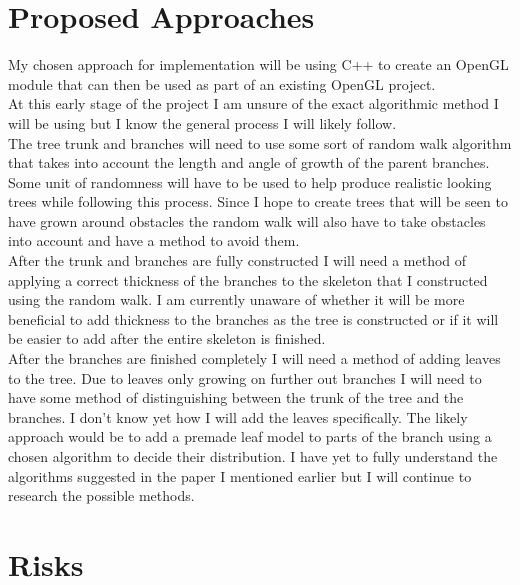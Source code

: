 \documentclass[proposal]{cmpreport}
\begin{document}
\section{Proposed Approaches}
My chosen approach for implementation will be using C++ to create an OpenGL module 
that can then be used as part of an existing OpenGL project. \\
At this early stage of the project I am unsure of the exact algorithmic method I 
will be using but I know the general process I will likely follow. \\
The tree trunk and branches will need to use some sort of random walk algorithm that 
takes into account the length and angle of growth of the parent branches. Some unit 
of randomness will have to be used to help produce realistic looking trees while 
following this process. Since I hope to create trees that will be seen to have grown 
around obstacles the random walk will also have to take obstacles into account and 
have a method to avoid them. \\
After the trunk and branches are fully constructed I will need a method of applying 
a correct thickness of the branches to the skeleton that I constructed using the 
random walk. I am currently unaware of whether it will be more beneficial to add 
thickness to the branches as the tree is constructed or if it will be easier to add 
after the entire skeleton is finished. \\
After the branches are finished completely I will need a method of adding leaves to 
the tree. Due to leaves only growing on further out branches I will need to have 
some method of distinguishing between the trunk of the tree and the branches. I don't 
know yet how I will add the leaves specifically. The likely approach would be to add 
a premade leaf model to parts of the branch using a chosen algorithm to decide their 
distribution. I have yet to fully understand the algorithms suggested in the paper I 
mentioned earlier \cite{colonization} but I will continue to research the possible 
methods.

\pagebreak
\section{Risks}

\pagebreak

\end{document}
